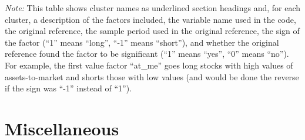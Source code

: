 \documentclass[12pt,title,fleqn]{article}
\begin{document}
\hspace{-1cm}
\begin{minipage}{1.05\textwidth}
        \footnotesize
        {\it Note:} This table shows cluster names as underlined section headings and, for each cluster, a description of the factors included, the variable name used in the code, the original reference, the sample period used in the original reference, the sign of the factor (``1'' means ``long'', ``-1'' means ``short''), and whether the original reference found the factor to be significant (``1'' means ``yes'', ``0'' means ``no''). For example, the first value factor ``at\_me'' goes long stocks with high values of assets-to-market and shorts those with low values (and would be done the reverse if the sign was ``-1'' instead of ``1'').
\end{minipage}

\newpage
\section{Miscellaneous}
\end{document}
